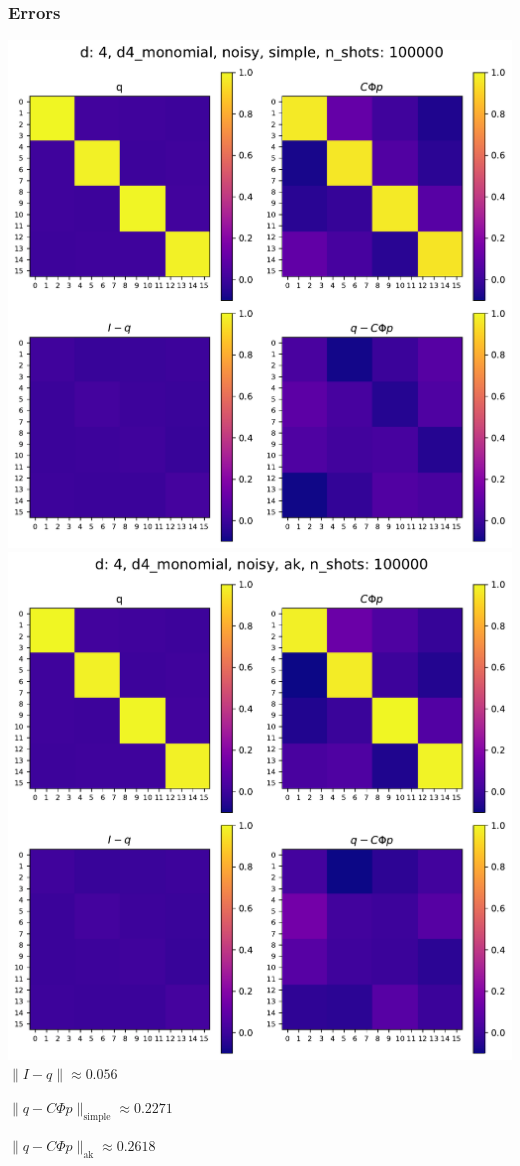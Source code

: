 \documentclass{beamer}
\begin{document}
\begin{frame}
\frametitle{Errors}
\begin{center}
\includegraphics[scale=0.25]{img/q_d4_d4_monomial_noisy_simple_n100000}\includegraphics[scale=0.25]{img/q_d4_d4_monomial_noisy_ak_n100000}	$\lVert I - q\rVert \approx 0.056$

$\lVert q - C \Phi p\rVert_{\text{simple}} \approx 0.2271$

$\lVert q - C \Phi p\rVert_{\text{ak}} \approx 0.2618$

\end{center}	
\end{frame}
\end{document}
